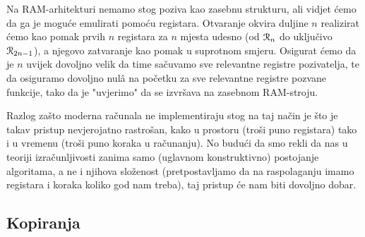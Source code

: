 Na RAM-arhitekturi nemamo stog poziva kao zasebnu strukturu, ali vidjet ćemo da ga je moguće emulirati pomoću registara. Otvaranje okvira duljine $n$ realizirat ćemo kao pomak prvih $n$ registara za $n$ mjesta udesno (od $\mathcal R_{n}$ do uključivo $\mathcal R_{2n-1}$), a njegovo zatvaranje kao pomak u suprotnom smjeru. Osigurat ćemo da je $n$ uvijek dovoljno velik da time sačuvamo sve relevantne registre pozivatelja, te da osiguramo dovoljno nulâ na početku za sve relevantne registre pozvane funkcije, tako da je "uvjerimo" da se izvršava na zasebnom RAM-stroju.

Razlog zašto moderna računala ne implementiraju stog na taj način je što je takav pristup nevjerojatno rastrošan, kako u prostoru (troši puno registara) tako i u vremenu (troši puno koraka u računanju). No budući da smo rekli da nas u teoriji izračunljivosti zanima samo (uglavnom konstruktivno) postojanje algoritama, a ne i njihova složenost (pretpostavljamo da na raspolaganju imamo registara i koraka koliko god nam treba), taj pristup će nam biti dovoljno dobar.

\subsection{Kopiranja}

